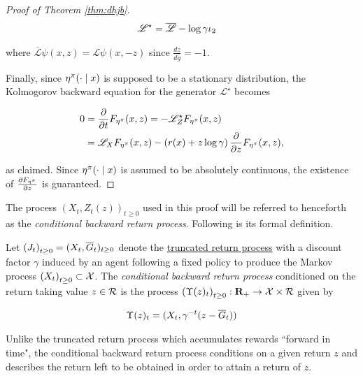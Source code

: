 \begin{proof}[Proof of Theorem \ref{thm:dhjb}]
  \begin{align*}
    \mathscr{L}^\star &= \overline{\mathscr{L}} - \log\gamma\proj{2}
  \end{align*}

  where $\overline{\mathscr{L}}\psi(x, z) = \mathscr{L}\psi(x, -z)$ since $\frac{dz}{d\overline{g}} = -1$.

  Finally, since $\returnmeasure^\pi(\cdot\mid x)$ is supposed to be a
  stationary distribution, the Kolmogorov backward equation for the generator
  $\mathscr{L}^\star$ becomes

  \begin{align*}
    0 &= \partialderiv{}{t}\cdf(x, z) =
        -\mathscr{L}_Z^\star\cdf(x, z)\\
    &= \mathscr{L}_X\cdf(x, z)
      -\left(r(x)+
      z\log\gamma\right)\partialderiv{}{z}\cdf(x, z),
  \end{align*}

  as claimed. Since $\returnmeasure^\pi(\cdot\mid x)$ is assumed to be
  absolutely continuous, the existence of $\partialderiv{\cdf}{z}$ is guaranteed.
\end{proof}

The process $(X_t, Z_t(z))_{t\geq 0}$ used in this proof will be referred to henceforth as
the \emph{conditional backward return process}. Following is its formal definition.

\begin{definition}\label{def:conditional-backward-return}
  Let $\indexedabove{t}{J} = (X_t, \overline{G}_t)_{t\geq 0}$ denote the
  \hyperref[def:truncated-return]{truncated return process} with a discount
  factor $\gamma$ induced by
  an agent following a fixed policy to produce the Markov process
  $\indexedabove{t}{X}\subset\mathcal{X}$. The \emph{conditional backward return
  process} conditioned on the return taking value $z\in\returnspace$ is the process
  $\indexedabove{t}{\cbrprocess(z)}:\mathbf{R}_+\to\mathcal{X}\times\returnspace$
  given by

  \begin{align*}
    \cbrprocess(z)_t &= (X_t, \gamma^{-t}(z - \overline{G}_t))\\
  \end{align*}

\end{definition}

Unlike the truncated return process which accumulates rewards ``forward in
time", the conditional backward return process conditions on a given return
$z$ and describes the return left to be obtained in order to attain a return of
$z$.

